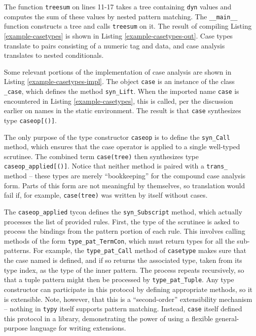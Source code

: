 \documentclass[preprint,10pt]{sigplanconf}
\newcommand{\lip}[1]{\lstinline[language=Python,basicstyle=\ttfamily\small,deletendkeywords={tuple,buffer,map}]{#1}}
\begin{document}
The function \lip{treesum} on lines 11-17 takes a tree containing \lip{dyn} values and computes the sum of these values by nested pattern matching. The \lip{__main__} function constructs a tree and calls \lip{treesum} on it. The result of compiling Listing \ref{example-casetypes} is shown in Listing \ref{example-casetypes-out}. Case types translate to pairs consisting of a numeric tag and data, and case analysis translates to nested conditionals.

Some relevant portions of the implementation of case analysis are shown in Listing \ref{example-casetypes-impl}. The object \lip{case} is an instance of the class \lip{_case}, which defines the method \lip{syn_Lift}. When the imported name \lip{case} is encountered in Listing \ref{example-casetypes}, this is called, per the discussion earlier on names in the static environment. The result is that \lip{case} synthesizes type \lip{caseop[()]}.

The only purpose of the type constructor \lip{caseop} is to define the \lip{syn_Call} method, which ensures that the case operator is applied to a single well-typed scrutinee. The combined term \lip{case(tree)} then synthesizes type \lip{caseop_applied[()]}. Notice that neither method is paired with a \lip{trans_} method -- these types are merely ``bookkeeping'' for the compound case analysis form. Parts of this form are not meaningful by themselves, so translation would fail if, for example, \lip{case(tree)} was written by itself without cases.

The \lip{caseop_applied} tycon defines the \lip{syn_Subscript} method, which actually processes the list of provided rules. First, the type of the scrutinee is asked to process the bindings from the pattern portion of each rule. This involves calling methods of the form \lip{type_pat_TermCon}, which must return types for all the sub-patterns. For example, the \lip{type_pat_Call} method of \lip{casetype} makes sure that the case named is defined, and if so returns the associated type, taken from its type index, as the type of the inner pattern. The process repeats recursively, so that a tuple pattern might then be processed by \lip{type_pat_Tuple}. Any type constructor can participate in this protocol by defining appropriate methods, so it is extensible. Note, however, that this is a ``second-order'' extensibility mechanism -- nothing in \verb|typy| itself supports pattern matching. Instead, \lip{case} itself defined this protocol in a library, demonstrating the power of using a flexible general-purpose language for writing extensions.
\end{document}
